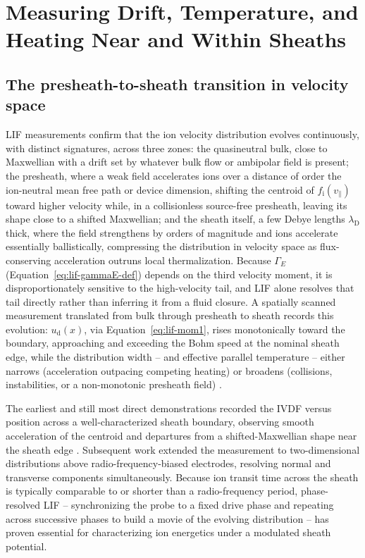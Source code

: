 \section{Measuring Drift, Temperature, and Heating Near and Within Sheaths}

\subsection{The presheath-to-sheath transition in velocity space}

LIF measurements confirm that the ion velocity distribution evolves continuously, with distinct signatures, across three zones: the quasineutral bulk, close to Maxwellian with a drift set by whatever bulk flow or ambipolar field is present; the presheath, where a weak field accelerates ions over a distance of order the ion-neutral mean free path or device dimension, shifting the centroid of $f_{\mathrm{i}}(v_{\parallel})$ toward higher velocity while, in a collisionless source-free presheath, leaving its shape close to a shifted Maxwellian; and the sheath itself, a few Debye lengths $\lambda_{\mathrm{D}}$ thick, where the field strengthens by orders of magnitude and ions accelerate essentially ballistically, compressing the distribution in velocity space as flux-conserving acceleration outruns local thermalization. Because $\Gamma_{E}$ (Equation~\eqref{eq:lif-gammaE-def}) depends on the third velocity moment, it is disproportionately sensitive to the high-velocity tail, and LIF alone resolves that tail directly rather than inferring it from a fluid closure. A spatially scanned measurement translated from bulk through presheath to sheath records this evolution: $u_{\mathrm{d}}(x)$, via Equation~\eqref{eq:lif-mom1}, rises monotonically toward the boundary, approaching and exceeding the Bohm speed at the nominal sheath edge, while the distribution width -- and effective parallel temperature -- either narrows (acceleration outpacing competing heating) or broadens (collisions, instabilities, or a non-monotonic presheath field) \cite{ref0329}.

The earliest and still most direct demonstrations recorded the IVDF versus position across a well-characterized sheath boundary, observing smooth acceleration of the centroid and departures from a shifted-Maxwellian shape near the sheath edge \cite{ref0329}. Subsequent work extended the measurement to two-dimensional distributions above radio-frequency-biased electrodes, resolving normal and transverse components simultaneously. Because ion transit time across the sheath is typically comparable to or shorter than a radio-frequency period, phase-resolved LIF -- synchronizing the probe to a fixed drive phase and repeating across successive phases to build a movie of the evolving distribution -- has proven essential for characterizing ion energetics under a modulated sheath potential.

